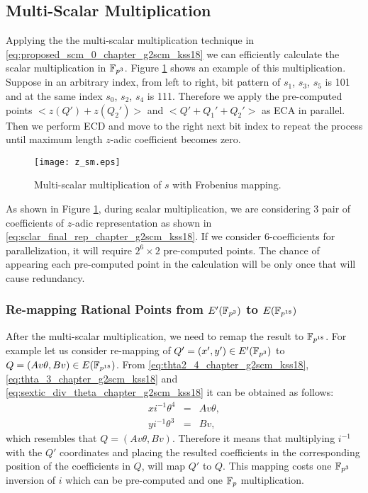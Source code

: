 \subsection{Multi-Scalar Multiplication}
Applying the the multi-scalar multiplication technique in \eqref{eq:proposed_scm_0_chapter_g2scm_kss18} we can efficiently calculate the scalar multiplication in $\mathbb{F}_{p^3}$. Figure \ref{eq:fig:z_sml_chapter_g2scm_kss18} shows an example of this multiplication.
Suppose in an arbitrary index, from left to right, bit pattern of $s_1$, $s_3$, $s_5$ is 101 and at the same index $s_0$, $s_2$, $s_4$ is 111.
Therefore we apply the pre-computed points $< z(Q')+z(Q_2') >$ and $<Q'+Q_1'+Q_2'>$ as ECA in parallel.
Then we perform ECD and move to the right next bit index to repeat the process until maximum length $z$-adic coefficient becomes zero.
\begin{figure}[!ht]
\centering
\texttt{[image: z\_sm.eps]}
\caption{Multi-scalar multiplication of $s$ with Frobenius mapping.}
\label{eq:fig:z_sml_chapter_g2scm_kss18}
\end{figure}

As shown in Figure \ref{eq:fig:z_sml_chapter_g2scm_kss18}, during scalar multiplication, we are considering 3 pair of coefficients of $z$-adic representation as shown in  \eqref{eq:sclar_final_rep_chapter_g2scm_kss18}. If we consider 6-coefficients for parallelization, it will require $2^6 \times 2$ pre-computed points. The chance of appearing each pre-computed point in the calculation will be only once that will cause redundancy.  

\subsubsection{Re-mapping Rational Points from \texorpdfstring{$E'(\mathbb{F}_{p^3})$}{} to  \texorpdfstring{$E(\mathbb{F}_{p^{18}})$}{}}
 After the multi-scalar multiplication, we need to remap the result to $\mathbb{F}_{p^{18}}$. For example let us consider re-mapping of $Q' =(x',y') \in E'(\mathbb{F}_{p^3})$ to $Q =(Av\theta,Bv) \in E(\mathbb{F}_{p^{18}})$. From \eqref{eq:thta2_4_chapter_g2scm_kss18}, \eqref{eq:thta_3_chapter_g2scm_kss18} and \eqref{eq:sextic_div_theta_chapter_g2scm_kss18} it can be obtained as follows:
 \begin{subequations}
 \begin{eqnarray}
 x i^{-1}\theta^{4} & = & Av\theta, \nonumber \\
 y i^{-1}\theta^{3} & = & Bv, \nonumber
 \end{eqnarray}
 \end{subequations}
  which resembles that $Q= (Av\theta, Bv)$. Therefore it means that multiplying $i^{-1}$ with the $Q'$ coordinates and placing the resulted coefficients in the corresponding position of the coefficients in $Q$, will map $Q'$ to $Q$.
This mapping costs one $\mathbb{F}_{p^3}$ inversion of $i$ which can be pre-computed and one ${\mathbb{F}}_{p}$ multiplication.

